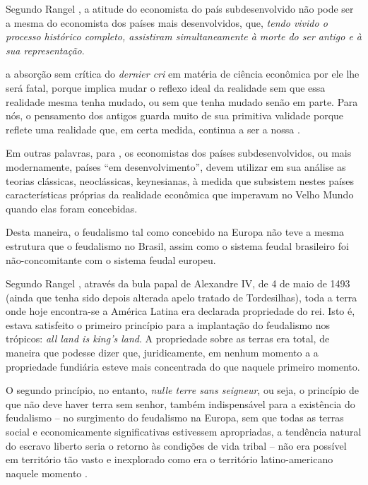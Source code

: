 \documentclass[
	12pt,				%
	oneside,			%
	a4paper,			%
	chapter=TITLE,		%
	section=TITLE,		%
	english,			%
	brazil				%
	]{abntex2}
\begin{document}
Segundo Rangel \autocite*[206]{rangel1956}, a atitude do economista do
país subdesenvolvido não pode ser a mesma do economista dos países mais
desenvolvidos, que, \emph{tendo vivido o processo histórico completo,
assistiram simultaneamente à morte do ser antigo e à sua representação}.
\begin{citacao} 
a absorção sem crítica do \emph{dernier cri} em matéria de ciência econômica por
ele lhe será fatal, porque implica mudar o reflexo ideal da realidade sem que
essa realidade mesma tenha mudado, ou sem que tenha mudado senão em parte. Para
nós, o pensamento dos antigos guarda muito de sua primitiva validade porque
reflete uma realidade que, em certa medida, continua a ser a nossa
\cite[p.~206-207]{rangel1956}.
\end{citacao}
Em outras palavras, para \textcite{rangel1956}, os economistas dos
países subdesenvolvidos, ou mais modernamente, países ``em
desenvolvimento'', devem utilizar em sua análise as teorias clássicas,
neoclássicas, keynesianas, à medida que subsistem nestes países
características próprias da realidade econômica que imperavam no Velho
Mundo quando elas foram concebidas.

Desta maneira, o feudalismo tal como concebido na Europa não teve a
mesma estrutura que o feudalismo no Brasil, assim como o sistema feudal
brasileiro foi não-concomitante com o sistema feudal europeu.

Segundo Rangel \autocite*[726]{rangel1989}, através da bula papal de
Alexandre IV, de 4 de maio de 1493 (ainda que tenha sido depois alterada
apelo tratado de Tordesilhas), toda a terra onde hoje encontra-se a
América Latina era declarada propriedade do rei. Isto é, estava
satisfeito o primeiro princípio para a implantação do feudalismo nos
trópicos: \emph{all land is king's land}. A propriedade sobre as terras
era total, de maneira que podesse dizer que, juridicamente, em nenhum
momento a a propriedade fundiária esteve mais concentrada do que naquele
primeiro momento.

O segundo princípio, no entanto, \emph{nulle terre sans seigneur}, ou
seja, o princípio de que não deve haver terra sem senhor, também
indispensável para a existência do feudalismo -- no surgimento do
feudalismo na Europa, sem que todas as terras social e economicamente
significativas estivessem apropriadas, a tendência natural do escravo
liberto seria o retorno às condições de vida tribal -- não era possível
em território tão vasto e inexplorado como era o território
latino-americano naquele momento \autocite[726]{rangel1989}.
\end{document}
